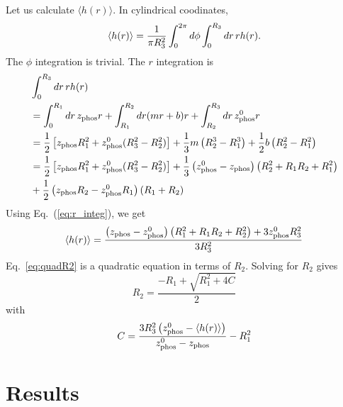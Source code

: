 Let us calculate $\langle h(r) \rangle$. In cylindrical coodinates, 
\begin{equation}
  \langle h(r) \rangle 
  = \frac{1}{\pi R_3^2} \int_0^{2\pi}d\phi \int_0^{R_3}\mathop{dr} rh(r).
\end{equation}
The $\phi$ integration is trivial. The $r$ integration is
\begin{align}
  & \int_0^{R_3}\mathop{dr} rh(r) \nonumber\\
  &= \int_0^{R_1}\mathop{dr} z_\textrm{phos} r + \int_{R_1}^{R_2}\mathop{dr} (mr+b)r + \int_{R_2}^{R_3}\mathop{dr} z_\textrm{phos}^0r \nonumber\\
  &= \frac{1}{2}\left[z_\textrm{phos} R_1^2+z_\textrm{phos}^0(R_3^2-R_2^2)\right] + 
     \frac{1}{3}m\left(R_2^3-R_1^3\right) + 
     \frac{1}{2}b\left(R_2^2-R_1^2\right) \nonumber\\        
  &= \frac{1}{2}\left[z_\textrm{phos} R_1^2+z_\textrm{phos}^0(R_3^2-R_2^2)\right] +
     \frac{1}{3}\left(z_\textrm{phos}^0-z_\textrm{phos}\right)\left(R_2^2+R_1R_2+R_1^2\right) \nonumber\\
  &  + \frac{1}{2}\left(z_\textrm{phos} R_2-z_\textrm{phos}^0 R_1\right)\left(R_1+R_2\right) \label{eq:r_integ}
\end{align}
Using Eq.~(\ref{eq:r_integ}), we get 
\begin{equation}
  \langle h(r) \rangle 
  = \frac{\left(z_\textrm{phos}-z_\textrm{phos}^0\right)\left(R_1^2+R_1R_2+R_2^2\right)+3z_\textrm{phos}^0R_3^2}{3R_3^2}
  \label{eq:quadR2}
\end{equation}
Eq.~\ref{eq:quadR2} is a quadratic equation in terms of $R_2$. 
Solving for $R_2$ gives
\begin{equation}
  R_2 = \frac{-R_1+\sqrt{R_1^2+4C}}{2} 
\end{equation}
with
\begin{equation}
  C = \frac{3R_3^2\left(z_\textrm{phos}^0-\langle h(r)\rangle\right)}{z_\textrm{phos}^0-z_\textrm{phos}} - R_1^2
\end{equation}

\section{Results}

